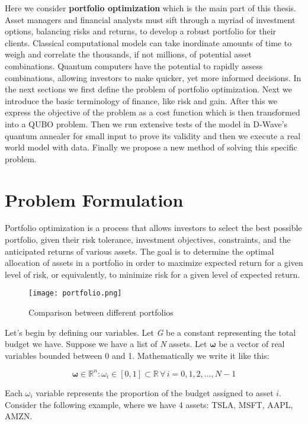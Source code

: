 \documentclass[12pt,a4paper]{report}
\begin{document}
\noindent
Here we consider \textbf{portfolio optimization} which is the main part of this thesis. Asset managers and financial analysts must sift through a myriad of investment options, balancing risks and returns, to develop a robust portfolio for their clients. Classical computational models can take inordinate amounts of time to weigh and correlate the thousands, if not millions, of potential asset combinations. Quantum computers have the potential to rapidly assess combinations, allowing investors to make quicker, yet more informed decisions. In the next sections we first define the problem of portfolio optimization. Next we introduce the basic terminology of finance, like risk and gain. After this we express the objective of the problem as a cost function which is then transformed into a QUBO problem. Then we run extensive tests of the model in D-Wave's quantum annealer for small input to prove its validity and then we execute a real world model with data. Finally we propose a new method of solving this specific problem.
\newpage

\section{Problem Formulation}

Portfolio optimization is a process that allows investors to select the best possible portfolio, given their risk tolerance, investment objectives, constraints, and the anticipated returns of various assets. The goal is to determine the optimal allocation of assets in a portfolio in order to maximize expected return for a given level of risk, or equivalently, to minimize risk for a given level of expected return.
\\

\begin{figure}[h]
    \centering
    \texttt{[image: portfolio.png]}
    \caption{Comparison between different portfolios}
    \label{fig:portfolio}
\end{figure}

\noindent
Let's begin by defining our variables. Let \textit{G} be a constant representing the total budget we have. Suppose we have a list of \textit{N} assets. Let $\bm{\omega}$ be a vector of real variables bounded between 0 and 1. Mathematically we write it like this:

\[
\bm{\omega} \in \mathbb{R}^n : \omega_i \in [0,1] \subset \mathbb{R} \, \forall \, i = 0,1,2, \ldots, N-1
\]

\noindent
Each \(\omega_i\) variable represents the proportion of the budget assigned to asset \(i\). Consider the following example, where we have 4 assets: TSLA, MSFT, AAPL, AMZN. \\
\end{document}
